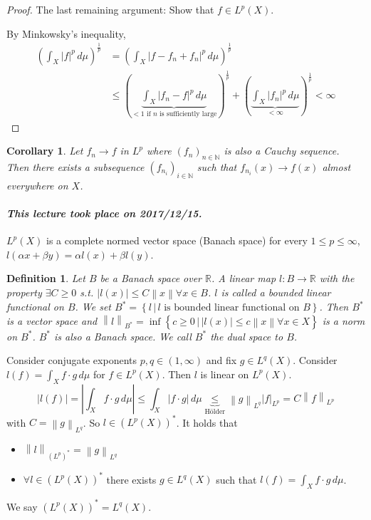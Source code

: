 \documentclass{article}
\newtheorem{definition}{Definition}  \numberwithin{definition}{section}
\newtheorem*{corollary}{Corollary}%
\newcommand{\setdef}[2]{\left\{\left.#1\,\right|\,#2\right\}}
\newcommand{\norm}[1]{\left\|#1\right\|}
\newcommand{\card}[1]{\left|#1\right|}
\newcommand{\dateref}[1]{\paragraph{\textit{This lecture took place on #1.}}}
\begin{document}
\begin{proof}
  The last remaining argument: Show that $f \in L^p(X)$.

  By Minkowsky's inequality, 
  \begin{align*}
    \left(\int_X \card{f}^p \, d\mu\right)^{\frac1p} &= \left(\int_X \card{f - f_n + f_n}^p \, d\mu\right)^{\frac1p} \\
      &\leq \left(\underbrace{\int_X \card{f_n - f}^p \, d\mu}_{<1 \text{ if $n$ is sufficiently large}}\right)^{\frac1p} + \left(\underbrace{\int_X \card{f_n}^p \, d\mu}_{<\infty}\right)^{\frac1p} < \infty
  \end{align*}
\end{proof}

\begin{corollary}
  Let $f_n \to f$ in $L^p$ where $(f_n)_{n \in \mathbb N}$ is also a Cauchy sequence.
  Then there exists a subsequence $(f_{n_i})_{i \in \mathbb N}$ such that $f_{n_i}(x) \to f(x)$ almost everywhere on $X$.
\end{corollary}

\dateref{2017/12/15}

$L^p(X)$ is a complete normed vector space (Banach space) for every $1 \leq p \leq \infty$, $l(\alpha x + \beta y) = \alpha l(x) + \beta l(y)$.

\begin{definition}
  Let $B$ be a Banach space over $\mathbb R$. A linear map $l: B \to \mathbb R$ with the property $\exists C \geq 0$ s.t. $\card{l(x)} \leq C \norm{x} \forall x \in B$.
  $l$ is called a bounded linear functional on $B$.
  We set $B^* = \setdef{l}{l \text{ is bounded linear functional on $B$}}$.
  Then $B^*$ is a vector space and $\norm{l}_{B^*} = \inf\setdef{c \geq 0}{\card{l(x)} \leq c \norm{x} \forall x \in X}$ is a norm on $B^*$.
  $B^*$ is also a Banach space. We call $B^*$ the dual space to $B$.
\end{definition}

Consider conjugate exponents $p,q \in (1,\infty)$ and fix $g \in L^q(X)$. Consider $l(f) = \int_X f \cdot g \, d\mu$ for $f \in L^p(X)$. Then $l$ is linear on $L^p(X)$.
\[ \card{l(f)} = \card{\int_X f \cdot g \, d\mu} \leq \int_X \card{f \cdot g} \, d\mu \underbrace{\leq}_{\text{H\"older}} \norm{g}_{L^q} \card{f}_{L^p} = C \norm{f}_{L^p} \]
with $C = \norm{g}_{L^q}$. So $l \in \left(L^p(X)\right)^*$. It holds that
\begin{itemize}
  \item $\norm{l}_{(L^p)^*} = \norm{g}_{L^q}$
  \item $\forall l \in (L^p(X))^*$ there exists $g \in L^q(X)$ such that $l(f) = \int_X f \cdot g \, d\mu$.
\end{itemize}
We say $\left(L^p(X)\right)^* = L^q(X)$.
\end{document}
